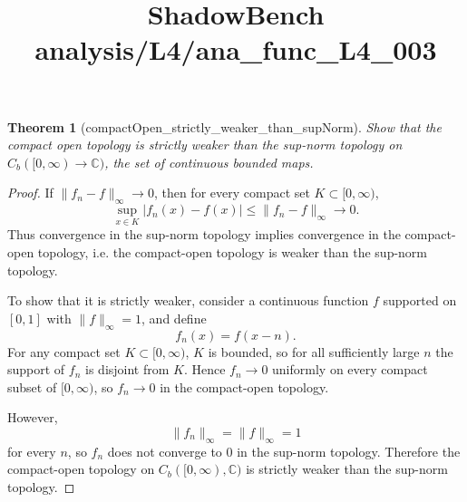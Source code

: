 \documentclass{article}
\title{ShadowBench analysis/L4/ana\_func\_L4\_003}
\newtheorem{theorem}{Theorem}
\begin{document}
\maketitle

\begin{theorem}[compactOpen_strictly_weaker_than_supNorm]
    Show that the compact open topology is strictly weaker than the sup-norm topology on $C_b ([0, \infty) \to \mathbb{C})$, the set of continuous bounded maps.
\end{theorem}

\begin{proof}
If $\|f_n-f\|_\infty\to 0$, then for every compact set $K\subset [0,\infty)$,
\[
\sup_{x\in K}|f_n(x)-f(x)|\le \|f_n-f\|_\infty \to 0.
\]
Thus convergence in the sup-norm topology implies convergence in the compact-open
topology, i.e. the compact-open topology is weaker than the sup-norm topology.

To show that it is strictly weaker, consider a continuous function $f$ supported
on $[0,1]$ with $\|f\|_\infty=1$, and define
\[
f_n(x)=f(x-n).
\]
For any compact set $K\subset [0,\infty)$, $K$ is bounded, so for all sufficiently
large $n$ the support of $f_n$ is disjoint from $K$. Hence $f_n\to 0$ uniformly on
every compact subset of $[0,\infty)$, so $f_n\to 0$ in the compact-open topology.

However,
\[
\|f_n\|_\infty=\|f\|_\infty=1
\]
for every $n$, so $f_n$ does not converge to $0$ in the sup-norm topology. Therefore
the compact-open topology on $C_b([0,\infty),\mathbb C)$ is strictly weaker than
the sup-norm topology.
\end{proof}
\end{document}
